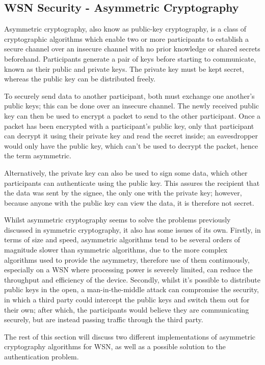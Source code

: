 \documentclass{mprop}
\begin{document}
\subsection{WSN Security - Asymmetric Cryptography} %
\label{sub:asymmetric_security}
Asymmetric cryptography, also know as public-key cryptography, is a class of cryptographic algorithms which enable two or more participants to establish a secure channel over an insecure channel with no prior knowledge or shared secrets beforehand. Participants generate a pair of keys before starting to communicate, known as their public and private keys. The private key must be kept secret, whereas the public key can be distributed freely. 

To securely send data to another participant, both must exchange one another's public keys; this can be done over an insecure channel. The newly received public key can then be used to encrypt a packet to send to the other participant. Once a packet has been encrypted with a participant's public key, only that participant can decrypt it using their private key and read the secret inside; an eavesdropper would only have the public key, which can't be used to decrypt the packet, hence the term asymmetric. 

Alternatively, the private key can also be used to sign some data, which other participants can authenticate using the public key. This assures the recipient that the data was sent by the signee, the only one with the private key; however, because anyone with the public key can view the data, it is therefore not secret.

Whilst asymmetric cryptography seems to solve the problems previously discussed in symmetric cryptography, it also has some issues of its own. Firstly, in terms of size and speed, asymmetric algorithms tend to be several orders of magnitude slower than symmetric algorithms, due to the more complex algorithms used to provide the asymmetry, therefore use of them continuously, especially on a WSN where processing power is severely limited, can reduce the throughput and efficiency of the device.
Secondly, whilst it's possible to distribute public keys in the open, a man-in-the-middle attack can compromise the security, in which a third party could intercept the public keys and switch them out for their own; after which, the participants would believe they are communicating securely, but are instead passing traffic through the third party.

The rest of this section will discuss two different implementations of asymmetric cryptography algorithms for WSN, as well as a possible solution to the authentication problem.
\end{document}

